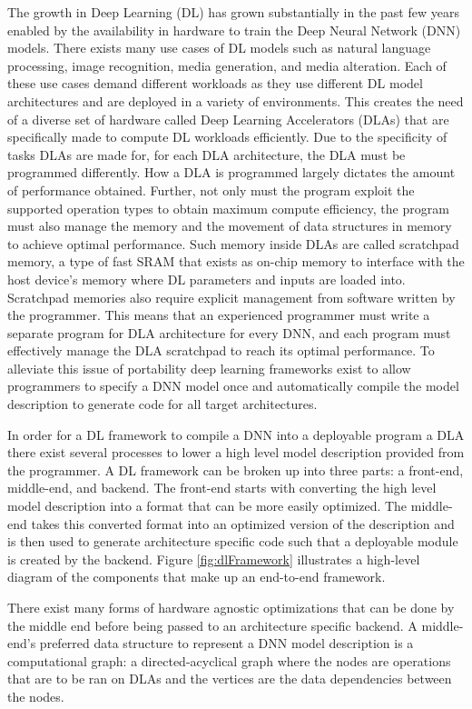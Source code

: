 The growth in Deep Learning (DL) has grown substantially in the past few years
enabled by the availability in hardware to train the Deep Neural Network (DNN)
models. There exists many use cases of DL models such as natural language
processing, image recognition, media generation, and media alteration. Each of
these use cases demand different workloads as they use different DL model
architectures and are deployed in a variety of environments. This creates the
need of a diverse set of hardware called Deep Learning Accelerators (DLAs) that
are specifically made to compute DL workloads efficiently. Due to the specificity
of tasks DLAs are made for, for each DLA architecture, the DLA must be programmed
differently. How a DLA is programmed largely dictates the amount of performance
obtained. Further, not only must the program exploit the supported operation types
to obtain maximum compute efficiency, the program must also manage the memory and
the movement of data structures in memory to achieve optimal performance. Such memory
inside DLAs are called scratchpad memory, a type of fast SRAM that exists as on-chip
memory to interface with the host device's memory where DL parameters and inputs are
loaded into. Scratchpad memories also require explicit management from software
written by the programmer.  This means that an experienced programmer must
write a separate program for DLA architecture for every DNN, and each program
must effectively manage the DLA scratchpad to reach its optimal performance. To
alleviate this issue of portability deep learning frameworks exist to allow
programmers to specify a DNN model once and automatically compile the model
description to generate code for all target architectures.

In order for a DL framework to compile a DNN into a deployable program a DLA
there exist several processes to lower a high level model description provided
from the programmer. A DL framework can be broken up into three parts: a
front-end, middle-end, and backend. The front-end starts with converting the
high level model description into a format that can be more easily optimized.
The middle-end takes this converted format into an optimized version of the
description and is then used to generate architecture specific code such that a
deployable module is created by the backend. Figure \ref{fig:dlFramework}
illustrates a high-level diagram of the components that make up an end-to-end
framework.

There exist many forms of hardware agnostic optimizations that can be done by
the middle end before being passed to an architecture specific backend. A
middle-end's preferred data structure to represent a DNN model description
is a computational graph: a directed-acyclical graph where the nodes are operations
that are to be ran on DLAs and the vertices are the data dependencies between
the nodes. 

